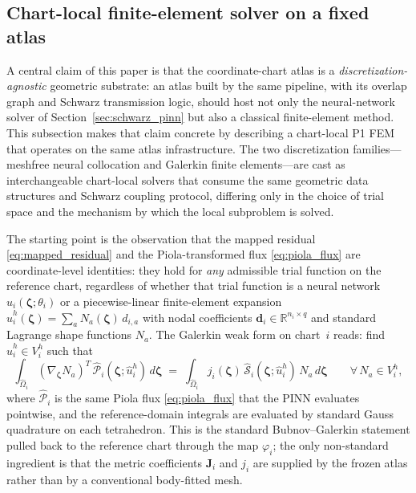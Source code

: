 \documentclass[sort&compress]{svjour3} %
\begin{document}
\subsection{Chart-local finite-element solver on a fixed atlas}
\label{sec:schwarz_fem}

A central claim of this paper is that the coordinate-chart atlas is a \emph{discretization-agnostic} geometric substrate: an atlas built by the same pipeline, with its overlap graph and Schwarz transmission logic, should host not only the neural-network solver of Section~\ref{sec:schwarz_pinn} but also a classical finite-element method. This subsection makes that claim concrete by describing a chart-local P1 FEM that operates on the same atlas infrastructure. The two discretization families---meshfree neural collocation and Galerkin finite elements---are cast as interchangeable chart-local solvers that consume the same geometric data structures and Schwarz coupling protocol, differing only in the choice of trial space and the mechanism by which the local subproblem is solved.

The starting point is the observation that the mapped residual \eqref{eq:mapped_residual} and the Piola-transformed flux \eqref{eq:piola_flux} are coordinate-level identities: they hold for \emph{any} admissible trial function on the reference chart, regardless of whether that trial function is a neural network $\widehat{u}_i(\boldsymbol{\zeta};\theta_i)$ or a piecewise-linear finite-element expansion $\widehat{u}_i^h(\boldsymbol{\zeta}) = \sum_a N_a(\boldsymbol{\zeta})\,d_{i,a}$ with nodal coefficients $\mathbf{d}_i\in\mathbb{R}^{n_i\times q}$ and standard Lagrange shape functions $N_a$. The Galerkin weak form on chart~$i$ reads: find $\widehat{u}_i^h\in V_i^h$ such that
\begin{equation}
\int_{\widehat{\Omega}_i}
(\nabla_{\boldsymbol{\zeta}} N_a)^T\,
\widehat{\mathcal{P}}_i(\boldsymbol{\zeta};\widehat{u}_i^h)\,
d\boldsymbol{\zeta}
\;=\;
\int_{\widehat{\Omega}_i}
j_i(\boldsymbol{\zeta})\,\widehat{\mathcal{S}}_i(\boldsymbol{\zeta};\widehat{u}_i^h)\,N_a\,
d\boldsymbol{\zeta}
\qquad \forall\,N_a\in V_i^h,
\label{eq:fem_weak_form}
\end{equation}
where $\widehat{\mathcal{P}}_i$ is the same Piola flux \eqref{eq:piola_flux} that the PINN evaluates pointwise, and the reference-domain integrals are evaluated by standard Gauss quadrature on each tetrahedron. This is the standard Bubnov--Galerkin statement pulled back to the reference chart through the map $\varphi_i$; the only non-standard ingredient is that the metric coefficients $\mathbf{J}_i$ and $j_i$ are supplied by the frozen atlas rather than by a conventional body-fitted mesh.
\end{document}
